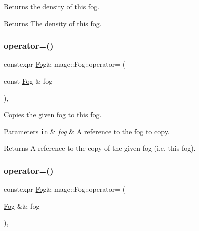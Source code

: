 Returns the density of this fog.

\begin{DoxyReturn}{Returns}
The density of this fog. 
\end{DoxyReturn}
\hypertarget{classmage_1_1_fog_add9a0a76790ea3e459827e9b04751ce8}{}\label{classmage_1_1_fog_add9a0a76790ea3e459827e9b04751ce8} 
\subsubsection{\texorpdfstring{operator=()}{operator=()}\hspace{0.1cm}{\footnotesize\ttfamily [1/2]}}
{\footnotesize\ttfamily constexpr \hyperlink{classmage_1_1_fog}{Fog}\& mage\+::\+Fog\+::operator= (\begin{DoxyParamCaption}\item[{const \hyperlink{classmage_1_1_fog}{Fog} \&}]{fog }\end{DoxyParamCaption})\hspace{0.3cm}{\ttfamily [default]}, {\ttfamily [noexcept]}}

Copies the given fog to this fog.


\begin{DoxyParams}[1]{Parameters}
\mbox{\tt in}  & {\em fog} & A reference to the fog to copy. \\
\hline
\end{DoxyParams}
\begin{DoxyReturn}{Returns}
A reference to the copy of the given fog (i.\+e. this fog). 
\end{DoxyReturn}
\hypertarget{classmage_1_1_fog_a8544e76bc78bc3258b5ce9cf215c2fd1}{}\label{classmage_1_1_fog_a8544e76bc78bc3258b5ce9cf215c2fd1} 
\subsubsection{\texorpdfstring{operator=()}{operator=()}\hspace{0.1cm}{\footnotesize\ttfamily [2/2]}}
{\footnotesize\ttfamily constexpr \hyperlink{classmage_1_1_fog}{Fog}\& mage\+::\+Fog\+::operator= (\begin{DoxyParamCaption}\item[{\hyperlink{classmage_1_1_fog}{Fog} \&\&}]{fog }\end{DoxyParamCaption})\hspace{0.3cm}{\ttfamily [default]}, {\ttfamily [noexcept]}}

